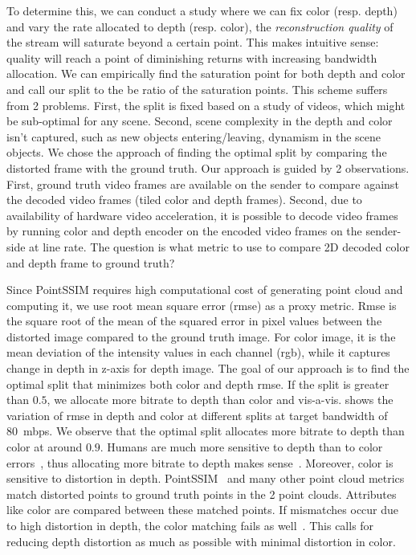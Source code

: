 \documentclass[sigconf]{acmart}
\begin{document}
To determine this, we can conduct a study where we can fix color (resp. depth) and vary the rate allocated to depth (resp. color), the \textit{reconstruction quality} of the stream will saturate beyond a certain point.
%
This makes intuitive sense: quality will reach a point of diminishing returns with increasing bandwidth allocation.
%
We can empirically find the saturation point for both depth and color and call our split to the be ratio of the saturation points.
%
This scheme suffers from 2 problems.
%
First, the split is fixed based on a study of videos, which might be sub-optimal for any scene.
%
Second, scene complexity in the depth and color isn't captured, such as new objects entering/leaving, dynamism in the scene objects.
%
%
We chose the approach of finding the optimal split by comparing the distorted frame with the ground truth. 
%
Our approach is guided by 2 observations. 
%
First, ground truth video frames are available on the sender to compare against the decoded video frames (tiled color and depth frames).
%
Second, due to availability of hardware video acceleration, it is possible to decode video frames by running color and depth encoder on the encoded video frames on the sender-side at line rate.
%
The question is what metric to use to compare 2D decoded color and depth frame to ground truth?

Since PointSSIM requires high computational cost of generating point cloud and computing it, we use root mean square error (rmse) as a proxy metric.
%
Rmse is the square root of the mean of the squared error in pixel values between the distorted image compared to the ground truth image. %
%
For color image, it is the mean deviation of the intensity values in each channel (rgb), while it captures change in depth in z-axis for depth image.
%
%
The goal of our approach is to find the optimal split that minimizes both color and depth rmse.
%
If the split is greater than $0.5$, we allocate more bitrate to depth than color and vis-a-vis.
%
 shows the variation of rmse in depth and color at different splits at target bandwidth of 80~mbps.
%
We observe that the optimal split allocates more bitrate to depth than color at around $0.9$.
%
Humans are much more sensitive to depth than to color errors~\cite{graphsim}, thus allocating more bitrate to depth makes sense~\cite{hoaran-referred, sigcomm-workshop}.
%
Moreover, color is sensitive to distortion in depth. PointSSIM~\cite{pointssim} and many other point cloud metrics match distorted points to ground truth points in the 2 point clouds. 
%
Attributes like color are compared between these matched points.
%
If mismatches occur due to high distortion in depth, the color matching fails as well~\cite{sigcomm-workshop}.
%
This calls for reducing depth distortion as much as possible with minimal distortion in color.
 
\end{document}
